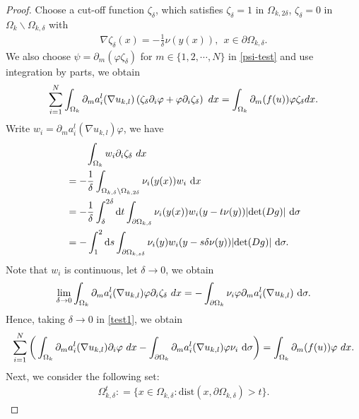 \documentclass[10pt,a4paper]{amsart}
\numberwithin{equation}{section}
\newcommand{\pa}{\partial}
\newcommand{\dx}{\textup{d}x}
\begin{document}
\begin{proof}
    Choose a cut-off function $\zeta_{\delta}$, which satisfies $ \zeta_{\delta} = 1$ in $\Omega_{k, 2\delta}$, $\zeta_{\delta} = 0$ in $\Omega_k \backslash \Omega_{k, \delta}$ with
    \begin{align*}
        \nabla \zeta_{\delta}(x) = - \frac{1}{\delta} \nu(y(x)), \ \ x \in \pa \Omega_{k, \delta}.
    \end{align*}
   We also choose $\psi  = \pa_m (\varphi \zeta_{\delta})$ for $m \in \{1,2,\cdots,N\}$ in \eqref{psi-test} and use integration by parts, we obtain
    \begin{align}\label{test1}
        \sum\limits_{i=1}^N \int_{\Omega_k} \pa_m a_i^l(\nabla u_{k,l}) \left( \zeta_{\delta}\pa_i \varphi + \varphi \pa_i \zeta_{\delta}\right) \ \dx = \int_{\Omega_k} \pa_m (f(u)) \varphi \zeta_{\delta}dx.
    \end{align}
    Write $w_i = \pa_m a_i^l(\nabla u_{k,l}) \varphi$, we have
    \begin{align*}
        &\qquad\int_{\Omega_k} w_i \pa_i \zeta_{\delta} \ \dx\\
         & = - \frac{1}{\delta}\int_{\Omega_{k, \delta} \backslash \Omega_{k, 2\delta}} \nu_i(y(x)) w_i \ \text{d}x \\
        & = - \frac{1}{\delta} \int_{\delta}^{2\delta} \text{d}t \int_{\pa \Omega_{k, \delta}} \nu_i(y(x)) w_i(y - t\nu(y)) |\text{det} (Dg)| \ \text{d} \sigma \\
        & = - \int_{1}^2 \text{d}s \int_{\pa \Omega_{k, s\delta}} \nu_i(y) w_i(y - s \delta\nu(y)) |\text{det} (Dg)| \ \text{d} \sigma .
    \end{align*}
    Note that $w_i$ is continuous, let $\delta \to 0$, we  obtain
    \begin{align*}
        \lim\limits_{\delta \to 0} \int_{\Omega_k} \pa_m a_i^l(\nabla u_{k,l}) \varphi \pa_i \zeta_{\delta} \ \dx = -\int_{\pa \Omega_k} \nu_i\varphi  \pa_m a_i^l(\nabla u_{k,l})  \ \text{d} \sigma.
    \end{align*}
    Hence, taking $\delta \to 0$ in \eqref{test1}, we obtain
    \begin{align}\label{test2}
        \sum\limits_{i=1}^N \bigg( \int_{\Omega_k}\pa_m a_i^l(\nabla u_{k,l}) \pa_i \varphi \ \dx - \int_{\pa \Omega_k} \pa_m a_i^l(\nabla u_{k,l})\varphi \nu_i \ \text{d} \sigma\bigg)  
         = \int_{\Omega_k} \pa_m (f(u)) \varphi \ \dx. 
    \end{align}
    Next, we consider the following set:
    \begin{align*}
        \Omega_{k,\delta}^{t} : = \{x \in \Omega_{k,\delta}: \text{dist}(x,\pa \Omega_{k,\delta}) > t\}.

\end{align*}
\end{proof}
\end{document}
